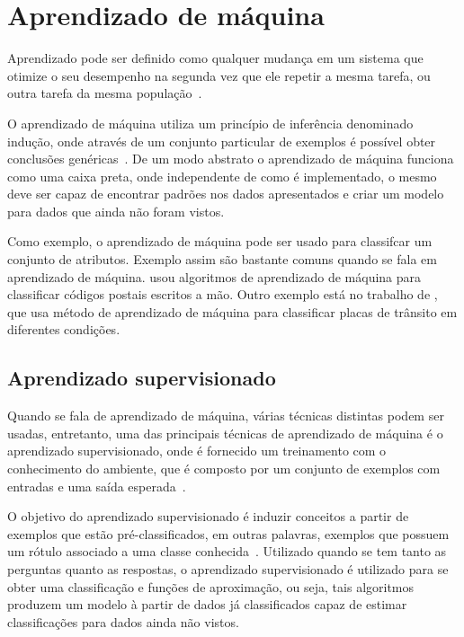 \section{Aprendizado de máquina}

Aprendizado pode ser definido como qualquer mudança em um sistema que
otimize o seu desempenho na segunda vez que ele repetir a mesma tarefa,
ou outra tarefa da mesma população~\cite{custodio2010aprendizadomaquina}.

O aprendizado de máquina utiliza um princípio de inferência denominado
indução, onde através de um conjunto particular de exemplos é possível
obter conclusões genéricas~\cite{bruno2010aprendizadomaquina}. De um modo
abstrato o aprendizado de máquina funciona como uma caixa preta, onde
independente de como é implementado, o mesmo deve ser capaz de encontrar padrões
nos dados apresentados e criar um modelo para dados que ainda não foram vistos.

Como exemplo, o aprendizado de máquina pode ser usado para classifcar
um conjunto de atributos. Exemplo assim são bastante comuns quando se fala em
aprendizado de máquina.  usou algoritmos de
aprendizado de máquina para classificar códigos postais escritos a mão. Outro
exemplo está no trabalho de , que usa método de
aprendizado de máquina para classificar placas de trânsito em diferentes
condições.


\subsection{Aprendizado supervisionado}

Quando se fala de aprendizado de máquina, várias técnicas distintas podem ser
usadas, entretanto, uma das principais técnicas de aprendizado de máquina é o aprendizado
supervisionado, onde é fornecido um treinamento com o conhecimento do
ambiente, que é composto por um conjunto de exemplos com entradas
e uma saída esperada~\cite{bruno2010aprendizadomaquina}.

O objetivo do aprendizado supervisionado é induzir conceitos a partir de
exemplos que estão pré-classificados, em outras palavras, exemplos que
possuem um rótulo associado a uma classe conhecida~\cite{bruno2010aprendizadomaquina}.
Utilizado quando se tem tanto as perguntas quanto as respostas, o aprendizado
supervisionado é utilizado para se obter uma classificação e funções de aproximação, ou seja,
tais algoritmos produzem um modelo à partir de dados já classificados capaz de estimar classificações
para dados ainda não vistos.

